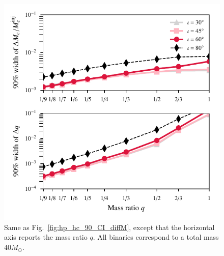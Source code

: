 \documentclass[prd,preprintnumbers,twocolumn,eqsecnum,floatfix,a4paper,nofootinbib,superscriptaddress]{revtex4}
\begin{document}
\begin{figure}[h]
	\begin{center}
		\includegraphics[scale=0.78]{figs/hp_hc_consistency_confidence_interval_varying_q.pdf}
	\end{center} 
	\caption{Same as Fig.~\ref{fig:hp_hc_90_CI_diffM}, except that the horizontal axis reports the mass ratio $q$. All binaries correspond to a total mass $40M_{\odot}$. }
	\label{fig:hp_hc_90_CI_diffq}
\end{figure}

\end{document}
